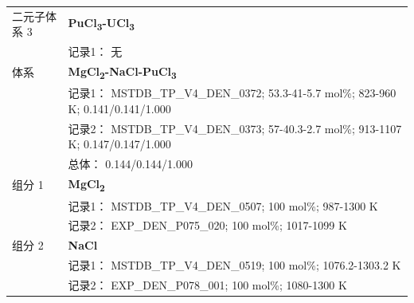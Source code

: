 \documentclass[12pt]{article}
\begin{document}
{\begin{longtable}[]{@{}
  >{\raggedright\arraybackslash}p{}
  >{\raggedright\arraybackslash}p{}@{}}
二元子体系 3 & \textbf{PuCl\textsubscript{3}-UCl\textsubscript{3}} \\
 & 记录1： 无 \\
\midrule
体系 & \textbf{MgCl\textsubscript{2}-NaCl-PuCl\textsubscript{3}} \\
 & 记录1： MSTDB\_TP\_V4\_DEN\_0372; 53.3-41-5.7 mol\%; 823-960 K; 0.141/0.141/1.000 \\
 & 记录2： MSTDB\_TP\_V4\_DEN\_0373; 57-40.3-2.7 mol\%; 913-1107 K; 0.147/0.147/1.000 \\
 & 总体： 0.144/0.144/1.000  \\

组分 1  & \textbf{MgCl\textsubscript{2}} \\
 & 记录1： MSTDB\_TP\_V4\_DEN\_0507; 100 mol\%; 987-1300 K \\
 & 记录2： EXP\_DEN\_P075\_020; 100 mol\%; 1017-1099 K  \\

组分 2  & \textbf{NaCl} \\
 & 记录1： MSTDB\_TP\_V4\_DEN\_0519; 100 mol\%; 1076.2-1303.2 K \\
 & 记录2： EXP\_DEN\_P078\_001; 100 mol\%; 1080-1300 K  \\


\end{longtable}}
\end{document}
